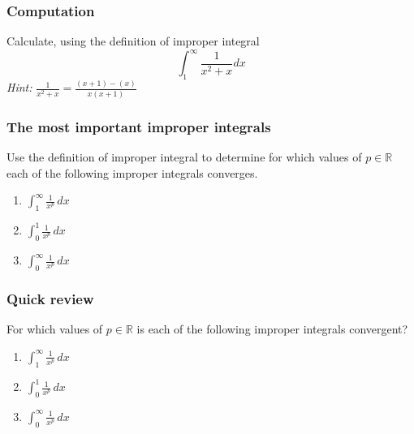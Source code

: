 \begin{frame}[t]
	\frametitle{Computation}

	Calculate, using the definition of improper integral
	\[
		\int_{1}^{\infty}\frac{1}{x^{2}+x}dx
	\]
	\emph{Hint:} $\displaystyle \frac{1}{x^{2}+x}= \frac{(x+1) - (x)}{x(x+1)}$
\end{frame}

\begin{frame}[t]
	\frametitle{The most important improper integrals}

	Use the definition of improper integral to determine for which values of
	$\displaystyle p \in \mathbb{R}$ each of the following improper integrals
	converges.

	\begin{enumerate}
		\item $\displaystyle \int_{1}^{\infty}\frac{1}{x^{p}}\, dx$
			\vfill

		\item $\displaystyle \int_{0}^{1}\frac{1}{x^{p}}\, dx$
			\vfill

		\item $\displaystyle \int_{0}^{\infty}\frac{1}{x^{p}}\, dx$
			\vfill
	\end{enumerate}
\end{frame}

\begin{frame}[t]
	\frametitle{Quick review}

	For which values of $\displaystyle p \in \mathbb{R}$ is each of the following
	improper integrals convergent?

	\begin{enumerate}
		\item $\displaystyle \int_{1}^{\infty}\frac{1}{x^{p}}\, dx$

			\vfill

		\item $\displaystyle \int_{0}^{1}\frac{1}{x^{p}}\, dx$

			\vfill

		\item $\displaystyle \int_{0}^{\infty}\frac{1}{x^{p}}\, dx$
	\end{enumerate}
\end{frame}


